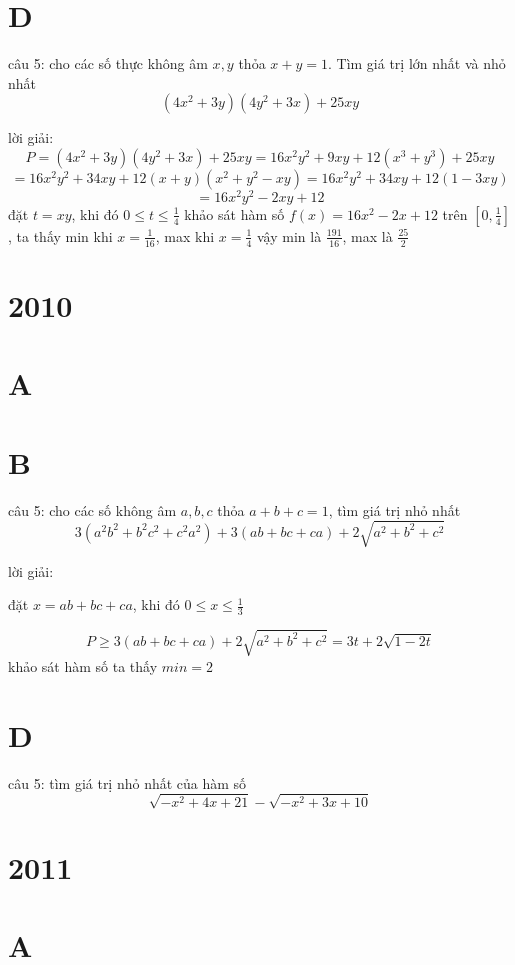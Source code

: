 \documentclass{article}
\begin{document}
\section*{D}

câu 5: cho các số thực không âm $x,y$ thỏa $x+y=1$. Tìm giá trị lớn nhất và nhỏ nhất
\[(4x^2+3y)(4y^2+3x)+25xy\]

lời giải:
\[P=(4x^2+3y)(4y^2+3x)+25xy = 16x^2y^2+9xy+12(x^3+y^3) + 25xy\]
\[=16x^2y^2+34xy + 12(x+y)(x^2+y^2-xy)=16x^2y^2+34xy + 12(1-3xy)\]
\[=16x^2y^2-2xy+12\]
đặt $t=xy$, khi đó $0\leq t \leq \frac{1}{4}$
\newline
khảo sát hàm số $f(x)=16x^2-2x+12$ trên $[0,\frac{1}{4}]$, ta thấy min khi $x=\frac{1}{16}$, max khi $x=\frac{1}{4}$
\newline
vậy min là $\frac{191}{16}$, max là $\frac{25}{2}$

\section*{2010}
\section*{A}


\section*{B}
câu 5: cho các số không âm $a,b,c$ thỏa $a+b+c=1$, tìm giá trị nhỏ nhất
\[3(a^2b^2 + b^2c^2 + c^2a^2) + 3(ab+bc+ca) + 2\sqrt{a^2+b^2+c^2}\]

lời giải:

đặt $x=ab+bc+ca$, khi đó $0\leq x \leq \frac{1}{3}$

\[P \geq 3(ab+bc+ca) + 2\sqrt{a^2+b^2+c^2} = 3t+2\sqrt{1-2t}\]
khảo sát hàm số ta thấy $min=2$
\section*{D}

câu 5: tìm giá trị nhỏ nhất của hàm số
\[\sqrt{-x^2+4x+21}-\sqrt{-x^2+3x+10}\]





\section*{2011}
\section*{A}
\end{document}
